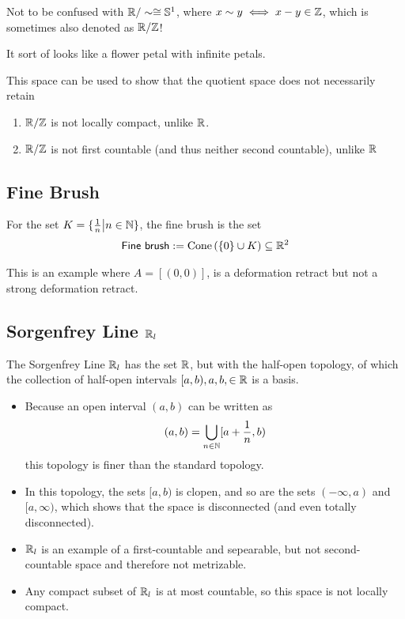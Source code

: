 Not to be confused with $\mathbb{R}/\sim \cong \mathbb{S}^{1}$, where $x \sim y \iff x-y \in \mathbb{Z}$, which is sometimes also denoted as $\mathbb{R}/\mathbb{Z}$!

It sort of looks like a flower petal with infinite petals.

This space can be used to show that the quotient space does not necessarily retain
\begin{enumerate}
  \item $\mathbb{R}/\mathbb{Z}$ is not locally compact, unlike $\mathbb{R}$.
  \item $\mathbb{R}/\mathbb{Z}$ is not first countable (and thus neither second countable), unlike $\mathbb{R}$
\end{enumerate}


\subsection*{Fine Brush}

For the set $K = \{\tfrac{1}{n} \big\vert n \in \mathbb{N}\}$, the fine brush is the set
\begin{align*}
  \textsf{Fine brush} := \text{Cone}\left(
    \{0\} \cup K
  \right) \subseteq \mathbb{R}^{2}
\end{align*}

This is an example where $A = [(0,0)]$, is a deformation retract but not a strong deformation retract.


\subsection*{Sorgenfrey Line $\mathbb{R}_l$}
The Sorgenfrey Line $\mathbb{R}_l$ has the set $\mathbb{R}$, but with the half-open topology, of which the collection of half-open intervals $[a,b), a,b, \in \mathbb{R}$ is a basis.

\begin{itemize}
  \item 
    Because an open interval $(a,b)$ can be written as
    \begin{align*}
      (a,b) = \bigcup_{n \in \mathbb{N}} [a + \frac{1}{n},b)
    \end{align*}
    this topology is finer than the standard topology.

  \item 
    In this topology, the sets $[a,b)$ is clopen, and so are the sets $(-\infty,a)$ and $[a,\infty)$, which shows that the space is disconnected (and even totally disconnected).

  \item $\mathbb{R}_l$ is an example of a first-countable and sepearable, but not second-countable space and therefore not metrizable.
  \item Any compact subset of $\mathbb{R}_l$ is at most countable, so this space is not locally compact.
\end{itemize}


